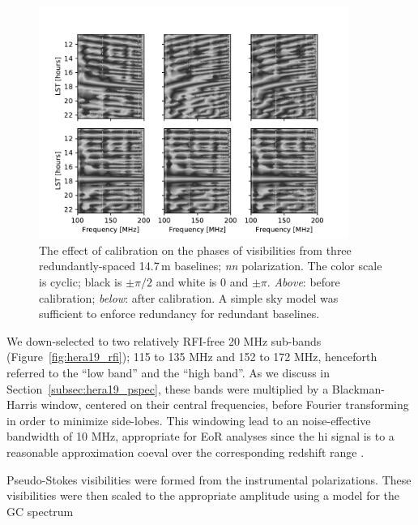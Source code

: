 \begin{figure}
\centering
\includegraphics[width=0.9\textwidth]{chapters/eor_window_HERA/figures/phases_pre_post_abscal_h19_cyclic_grey.pdf}
\caption[The effect of calibration on the phases of visibilities from three redundantly-spaced 14.7\,m baselines.]{The effect of calibration on the phases of visibilities from three redundantly-spaced 14.7\,m baselines; \textit{nn} polarization. The color scale is cyclic; black is $\pm\pi/2$ and white is 0 and $\pm\pi$. \textit{Above}: before calibration; \textit{below}: after calibration. A simple sky model was sufficient to enforce redundancy for redundant baselines.}
\label{fig:hera19_phasecal}
\end{figure}



We down-selected to two relatively RFI-free 20 MHz sub-bands (Figure~\ref{fig:hera19_rfi}); 115 to 135 MHz and 152 to 172 MHz, henceforth referred to the ``low band'' and the ``high band''. As we discuss in Section~\ref{subsec:hera19_pspec}, these bands were multiplied by a Blackman-Harris window, centered on their central frequencies, before Fourier transforming in order to minimize side-lobes. This windowing lead to an noise-effective bandwidth of 10 MHz, appropriate for EoR analyses since the {\sc hi} signal is to a reasonable approximation coeval over the corresponding redshift range \citep{Furlanetto.06}.

Pseudo-Stokes visibilities were formed from the instrumental polarizations. These visibilities were then scaled to the appropriate amplitude using a model for the GC spectrum 

